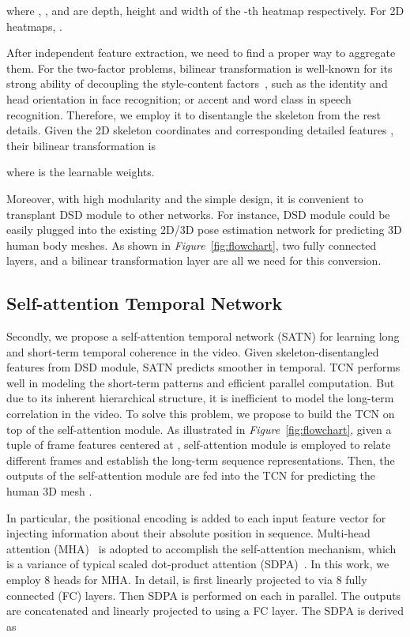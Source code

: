 \documentclass[10pt,twocolumn,letterpaper]{article}
\begin{document}
where ,  , and  are depth, height and width of the -th heatmap  respectively. For 2D heatmaps, .

After independent feature extraction, we need to find a proper way to aggregate them. For the two-factor problems, bilinear transformation is well-known for its strong ability of decoupling the style-content factors~\cite{bilinearfreeman}, such as the identity and head orientation in face recognition; or accent and word class in speech recognition. Therefore, we employ it to disentangle the skeleton from the rest details.
Given the 2D skeleton coordinates  and corresponding detailed features  , their bilinear transformation  is 

where  is the learnable weights. 

Moreover, with high modularity and the simple design, it is convenient to transplant DSD module to other networks. For instance, DSD module could be easily plugged into the existing 2D/3D pose estimation network for predicting 3D human body meshes. As shown in \textit{Figure}~\ref{fig:flowchart}, two fully connected layers, and a bilinear transformation layer are all we need for this conversion. 

\subsection{Self-attention Temporal Network}
Secondly, we propose a self-attention temporal network (SATN) for learning long and short-term temporal coherence in the video. Given skeleton-disentangled features from DSD module, SATN predicts smoother  in temporal. TCN performs well in modeling the short-term patterns and efficient parallel computation. But due to its inherent hierarchical structure, it is inefficient to model the long-term correlation in the video. To solve this problem, we propose to build the TCN on top of the self-attention module. As illustrated in \textit{Figure}~\ref{fig:flowchart}, given a tuple of frame features  centered at  , self-attention module is employed to relate different frames and establish the long-term sequence representations. Then, the outputs of the self-attention module are fed into the TCN for predicting the human 3D mesh . 

In particular, the positional encoding is added to each input feature vector for injecting information about their absolute position in sequence. Multi-head attention (MHA)~\cite{transformer} is adopted to accomplish the self-attention mechanism, which is a variance of typical scaled dot-product attention (SDPA)~\cite{transformer}. In this work, we employ 8 heads for MHA. In detail,  is first linearly projected to  via 8 fully connected (FC) layers. Then SDPA is performed on each  in parallel. The outputs are concatenated and linearly projected to  using a FC layer. The SDPA is derived as  
\end{document}
